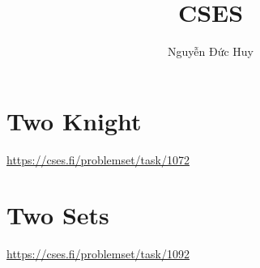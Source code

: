 \documentclass[12pt]{article}
\title{CSES}
\author{Nguyễn Đức Huy}
\begin{document}
\maketitle
\section{Two Knight}
\url{https://cses.fi/problemset/task/1072}
\section{Two Sets}
\url{https://cses.fi/problemset/task/1092}
\end{document}
